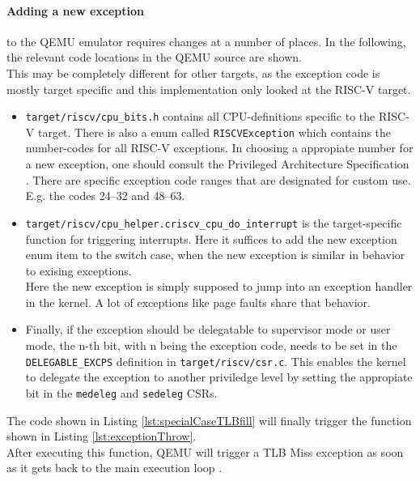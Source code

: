 

\paragraph{Adding a new exception}to the QEMU emulator requires changes at a number of places. In the following,
the relevant code locations in the QEMU source \cite{QEMUSource2024} are shown.\\
This may be completely different for other targets, as the exception code is mostly target specific and
this implementation only looked at the RISC-V target.
\begin{itemize}
    \item \texttt{target/riscv/cpu\_bits.h} contains all CPU-definitions specific to the RISC-V target.
          There is also a enum called \texttt{RISCVException} which contains the number-codes for all RISC-V exceptions.
          In choosing a appropiate number for a new exception, one should consult the Privileged Architecture Specification \cite{RISCVInstructionSet}.
          There are specific exception code ranges that are designated for custom use. E.g. the codes 24--32 and 48--63.
    \item \texttt{target/riscv/cpu\_helper.c\:riscv\_cpu\_do\_interrupt\(\)} is the target-specific function
          for triggering interrupts. Here it suffices to add the new exception enum item to the switch case, when
          the new exception is similar in behavior to exising exceptions.\\
          Here the new exception is simply supposed to jump into an exception handler in the kernel. A lot of exceptions
          like page faults share that behavior.
    \item Finally, if the exception should be delegatable to supervisor mode or user mode, the n-th bit,
          with n being the exception code, needs to be set in the \texttt{DELEGABLE\_EXCPS} definition in \texttt{target/riscv/csr.c}.
          This enables the kernel to delegate the exception to another priviledge level by setting the appropiate
          bit in the \texttt{medeleg} and \texttt{sedeleg} CSRs.
\end{itemize}

The code shown in Listing \ref{lst:specialCaseTLBfill} will finally trigger the function shown in
Listing \ref{lst:exceptionThrow}.\\ After executing this function, QEMU will trigger a TLB Miss exception as soon
as it gets back to the main execution loop \cite{QEMUSource2024}.

